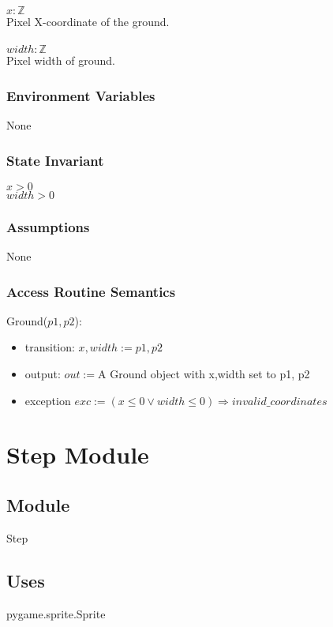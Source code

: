 \documentclass[12pt]{article}
\begin{document}
$x: \mathbb{Z}$\\
Pixel X-coordinate of the ground.\\\\
$width: \mathbb{Z}$\\
Pixel width of ground.
\subsubsection* {Environment Variables}

None

\subsubsection* {State Invariant}
$x > 0$\\
$width > 0$\\ 
\subsubsection* {Assumptions}
None
\subsubsection* {Access Routine Semantics}

\noindent Ground($p1, p2$):
\begin{itemize}
\item transition: $x,width := p1, p2$
\item output: $out := $A Ground object with x,width set to p1, p2
\item exception $ exc := (x \leq 0 \lor width \leq 0 ) \Rightarrow invalid\_coordinates $
\end{itemize}

\newpage

\section* {Step Module}

\subsection*{Module}

Step

\subsection* {Uses}

pygame.sprite.Sprite
\end{document}
